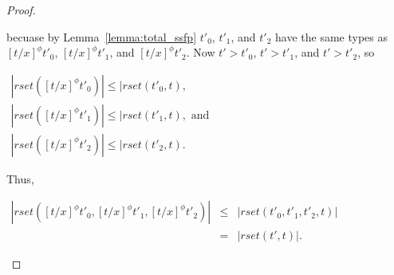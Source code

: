 \begin{proof}
\begin{itemize}
\begin{center}
  \end{center}
  becuase by Lemma~\ref{lemma:total_ssfp} $t'_0$, $t'_1$, and $t'_2$ have the same types as $[t/x]^\phi t'_0$, $[t/x]^\phi t'_1$, and $[t/x]^\phi t'_2$.
  Now $t' > t'_0$, $t' > t'_1$, and $t' > t'_2$, so 
  \begin{center}
    \begin{math}
      \begin{array}{lll}
        |rset([t/x]^\phi t'_0)| \leq |rset(t'_0, t),\\
        |rset([t/x]^\phi t'_1)| \leq |rset(t'_1, t), \text{ and }\\
        |rset([t/x]^\phi t'_2)| \leq |rset(t'_2, t).
      \end{array}
    \end{math}
  \end{center}
  Thus, 
  \begin{center}
    \begin{math}
      \begin{array}{lll}
        |rset([t/x]^\phi t'_0, [t/x]^\phi t'_1, [t/x]^\phi t'_2)| & \leq & |rset(t'_0,t'_1,t'_2,t)|\\
        & =    & |rset(t',t)|.
      \end{array}
    \end{math}
  \end{center}
  

\end{itemize}
\end{proof}
